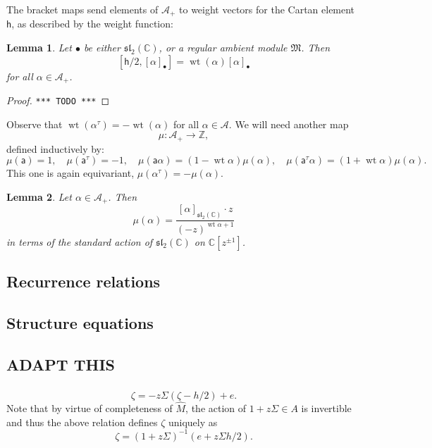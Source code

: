 \documentclass{article}
\def\MISS{\texttt{*** TODO ***}}
\def\fsl{\mathfrak{sl}}
\def\fM{\mathfrak{M}}
\def\sA{\mathcal{A}}
\def\ZZ{\mathbb{Z}}
\def\CC{\mathbb{C}}
\def\inv{\tau} %
\DeclareMathOperator{\wt}{\mathrm{wt}}
\def\a{\mathsf{a}}
\def\h{\mathsf{h}}
\newtheorem{lem}{Lemma}
\theoremstyle{definition}
\begin{document}
The bracket maps
send elements of $\sA_+$ to
weight vectors for the Cartan element $\h$,
as described by the weight function:
\begin{lem}
        Let $\bullet$ be either
        $\fsl_2(\CC)$,
        or a regular ambient module $\fM$. Then
        $$[\h/2, [\alpha]_\bullet] = \wt(\alpha) [\alpha]_\bullet$$
        for all $\alpha\in\sA_+$.
\end{lem}
\begin{proof}\MISS\end{proof}

Observe that $\wt(\alpha^\tau) = -\wt(\alpha)$ for
all $\alpha\in\sA$. 
We will need another map
$$ \mu : \sA_+ \to \ZZ,$$
defined inductively by:
$$
\mu(\a)=1,\quad\mu(\a^\inv)=-1,\quad \mu(\a\alpha) = (1-\wt\alpha)\mu(\alpha),\quad
\mu(\a^\inv\alpha) = (1 + \wt\alpha)\mu(\alpha).
$$
This one is again equivariant,
$\mu(\alpha^\tau)=-\mu(\alpha)$.
\begin{lem}
        Let $\alpha \in \sA_+$. Then
        $$
         \mu(\alpha) = \frac{[\alpha]_{\fsl_2(\CC)} \cdot z}{(-z)^{\wt\alpha + 1}}
        $$
        in terms of the standard action of $\fsl_2(\CC)$ on $\CC[z^{\pm1}]$.
\end{lem}


\subsection{Recurrence relations}

\subsection{Structure equations}

\subsection{ADAPT THIS}

\subsubsection{}
$$
\boxed{\zeta = -z\Sigma(\zeta-h/2) + e.}
$$
Note that by virtue of completeness of $\hat M$,
the action of $1 + z\Sigma \in A$ is invertible and thus the
above relation defines $\zeta$ uniquely as
$$ \zeta = (1+z\Sigma)^{-1} (e + z\Sigma h/2).$$
\end{document}
